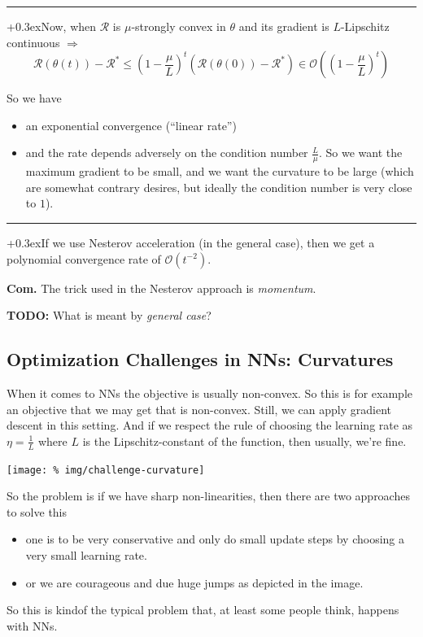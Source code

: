 \documentclass[a2paper,8pt]{extarticle}
\newcommand{\BigO}{\mathcal{O}}
\newcommand{\cR}{\mathcal{R}}
\newcommand{\todo}[1]{\textbf{TODO:} #1}
\newcommand{\todo}[1]{%
}
\newcommand{\customboxpaddingsize}{0pt}
\newcommand{\emptyarg}[1][]{\ifthenelse{\isempty{#1}}{}{\ (#1)}}
\newcommand{\Thm}[1][]{{\setlength\fboxsep{\customboxpaddingsize}
\colorbox{thmcolor}{%
\color{custtitlecolor}{\textbf{T.\emptyarg[#1]}}}\kern+0.3ex}}
\newcommand{\Com}{\textbf{Com.} }
\newcommand{\sep}{\vspace{0pt}\noindent\hrule\vspace{0pt}}
\newcommand{\sep}{\vspace{5pt}\noindent\hrule\vspace{5pt}}
\begin{document}
\begin{landscape}
\begin{multicols*}{7}

\sep

\Thm Now, when $\cR$ is $\mu$-strongly convex in $\theta$ and its gradient is
$L$-Lipschitz continuous $\Longrightarrow$
\[
\cR(\theta(t))
-
\cR^*
\leq
\left(1-\frac{\mu}{L}\right)^t
(\cR(\theta(0))-\cR^*)
\in
\BigO\left(\left(1-\frac{\mu}{L}\right)^t\right)
\]

So we have
\begin{itemize}
  \item an exponential convergence (``linear rate'')
  \item and the rate depends adversely on the condition number $\frac{L}{\mu}$.
  So we want the maximum gradient to be small, and we want the curvature to be
  large (which are somewhat contrary desires, but ideally the condition number
  is very close to $1$).
\end{itemize}

\sep

\Thm If we use Nesterov acceleration (in the general case), then we get a
polynomial convergence rate of $\BigO(t^{-2})$.

\Com The trick used in the Nesterov approach is \emph{momentum}.

\todo{What is meant by \emph{general case}?}

\subsection{Optimization Challenges in NNs: Curvatures}

When it comes to NNs the objective is usually non-convex. So this is for example
an objective that we may get that is non-convex. Still, we can apply gradient
descent in this setting. And if we respect the rule of choosing the learning
rate as $\eta=\frac{1}{L}$ where $L$ is the Lipschitz-constant of the function,
then usually, we're fine.

\begin{center}
  \texttt{[image: \%
img/challenge-curvature]}
\end{center}

So the problem is if we have sharp non-linearities, then there are two
approaches to solve this
\begin{itemize}
  \item one is to be very conservative and only do small update steps by
  choosing a very small learning rate.
  \item or we are courageous and due huge jumps as depicted in the image.
\end{itemize}
So this is kindof the typical problem that, at least some people think, happens
with NNs.


\end{multicols*}
\end{landscape}
\end{document}
